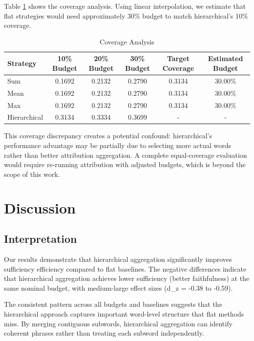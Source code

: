 \documentclass[journal]{IEEEtran}
\begin{document}
Table \ref{tab:coverage} shows the coverage analysis. Using linear interpolation, we estimate that flat strategies would need approximately 30\% budget to match hierarchical's 10\% coverage.

\begin{table}[htbp]
\centering
\caption{Coverage Analysis}
\label{tab:coverage}
\begin{tabular}{lccccc}
\toprule
Strategy & 10\% Budget & 20\% Budget & 30\% Budget & Target Coverage & Estimated Budget \\
\midrule
Sum & 0.1692 & 0.2132 & 0.2790 & 0.3134 & 30.00\% \\
Mean & 0.1692 & 0.2132 & 0.2790 & 0.3134 & 30.00\% \\
Max & 0.1692 & 0.2132 & 0.2790 & 0.3134 & 30.00\% \\
Hierarchical & 0.3134 & 0.3334 & 0.3699 & - & - \\
\bottomrule
\end{tabular}
\end{table}

This coverage discrepancy creates a potential confound: hierarchical's performance advantage may be partially due to selecting more actual words rather than better attribution aggregation. A complete equal-coverage evaluation would require re-running attribution with adjusted budgets, which is beyond the scope of this work.

\section{Discussion}

\subsection{Interpretation}

Our results demonstrate that hierarchical aggregation significantly improves sufficiency efficiency compared to flat baselines. The negative differences indicate that hierarchical aggregation achieves lower sufficiency (better faithfulness) at the same nominal budget, with medium-large effect sizes (d_z = -0.38 to -0.59).

The consistent pattern across all budgets and baselines suggests that the hierarchical approach captures important word-level structure that flat methods miss. By merging contiguous subwords, hierarchical aggregation can identify coherent phrases rather than treating each subword independently.
\end{document}
